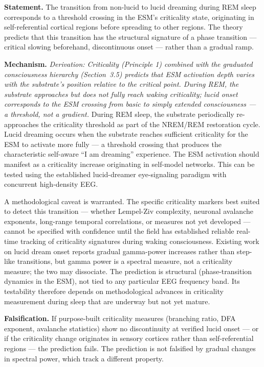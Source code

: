\documentclass[12pt]{article}
\begin{document}
\textbf{Statement.} The transition from non-lucid to lucid dreaming during REM sleep corresponds to a threshold crossing in the ESM's criticality state, originating in self-referential cortical regions before spreading to other regions. The theory predicts that this transition has the structural signature of a phase transition --- critical slowing beforehand, discontinuous onset --- rather than a gradual ramp.

\textbf{Mechanism.} \emph{Derivation: Criticality (Principle 1) combined with the graduated consciousness hierarchy (Section~3.5) predicts that ESM activation depth varies with the substrate's position relative to the critical point. During REM, the substrate approaches but does not fully reach waking criticality; lucid onset corresponds to the ESM crossing from basic to simply extended consciousness --- a threshold, not a gradient.} During REM sleep, the substrate periodically re-approaches the criticality threshold as part of the NREM/REM restoration cycle. Lucid dreaming occurs when the substrate reaches sufficient criticality for the ESM to activate more fully --- a threshold crossing that produces the characteristic self-aware ``I am dreaming'' experience. The ESM activation should manifest as a criticality increase originating in self-model networks. This can be tested using the established lucid-dreamer eye-signaling paradigm \citep{LaBerge1985} with concurrent high-density EEG.

A methodological caveat is warranted. The specific criticality markers best suited to detect this transition --- whether Lempel-Ziv complexity, neuronal avalanche exponents, long-range temporal correlations, or measures not yet developed --- cannot be specified with confidence until the field has established reliable real-time tracking of criticality signatures during waking consciousness. Existing work on lucid dream onset \citep{Voss2014} reports gradual gamma-power increases rather than step-like transitions, but gamma power is a spectral measure, not a criticality measure; the two may dissociate. The prediction is structural (phase-transition dynamics in the ESM), not tied to any particular EEG frequency band. Its testability therefore depends on methodological advances in criticality measurement during sleep that are underway but not yet mature.

\textbf{Falsification.} If purpose-built criticality measures (branching ratio, DFA exponent, avalanche statistics) show no discontinuity at verified lucid onset --- or if the criticality change originates in sensory cortices rather than self-referential regions --- the prediction fails. The prediction is not falsified by gradual changes in spectral power, which track a different property.
\end{document}
